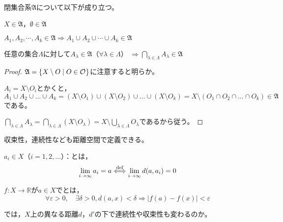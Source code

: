 \documentclass[uplatex]{jsarticle}
\begin{document}
\begin{prop}
    閉集合系$\mathfrak{A}$について以下が成り立つ。
    
     $X \in \mathfrak{A}$，$\emptyset \in \mathfrak{A}$

     $A_{1}, A_{2}, \cdots, A_{k} \in \mathfrak{A} \Longrightarrow A_{1} \cup A_{2} \cup \cdots \cup A_{k} \in \mathfrak{A}$

     任意の集合$\Lambda$に対して$A_{\lambda} \in \mathfrak{A}$（$\forall \lambda \in \Lambda$） ${\displaystyle \Longrightarrow \bigcap_{\lambda \in \Lambda} A_{\lambda} \in \mathfrak{A}}$
\end{prop}

\begin{proof}
     $\mathfrak{A} = \Set{\hspace{-1.8pt}  X \setminus O | O \in \mathcal{O} \hspace{-1.8pt}}$に注意すると明らか。

     $A_{i} = X \setminus O_{i}$とかくと，
    \begin{equation}
        A_{1} \cup A_{2} \cup \dots \cup A_{k}
        = (X \setminus O_{1}) \cup (X \setminus O_{2}) \cup \dots \cup (X \setminus O_{k})
        = X \setminus (O_{1} \cap O_{2} \cap \dots \cap O_{k}) \in \mathfrak{A}
    \end{equation}
    である。

     ${\displaystyle \bigcap_{\lambda \in \Lambda} A_{\lambda} = \bigcap_{\lambda \in \Lambda} (X \setminus O_{\lambda}) = X \setminus \bigcup_{\lambda \in \Lambda} O_{\lambda}}$であるから従う。
\end{proof}

収束性，連続性なども距離空間で定義できる。

\begin{teigi}
     $a_{i} \in X$（$i=1,2,\dots$）：とは，
    \begin{equation}
        \lim_{i \to \infty} a_{i} = a \overset{\mathrm{def}}{\Longleftrightarrow} \lim_{i \to \infty} d(a, a_{i}) = 0
    \end{equation}
    
     $f:X \longrightarrow \mathbb{R}$が$a \in X$でとは，
    \begin{equation}
        \forall \varepsilon > 0, \quad \exists \delta > 0, d(a,x) < \delta \Longrightarrow \left| f(a) - f(x) \right| < \varepsilon
    \end{equation}
\end{teigi}

では，$X$上の異なる距離$d$，$d'$の下で連続性や収束性も変わるのか。
\end{document}
